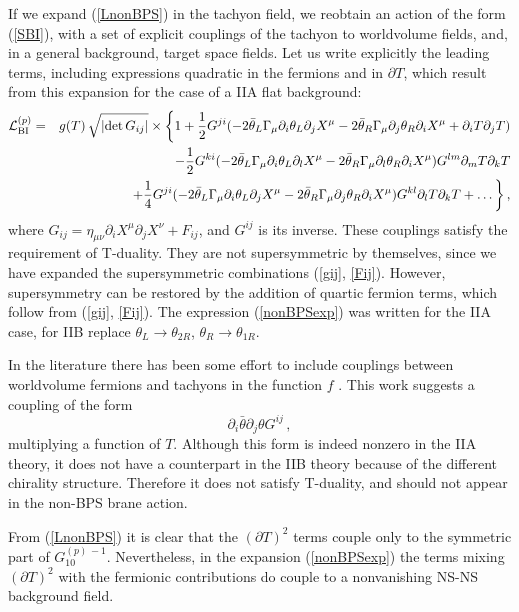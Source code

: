 \documentclass[12pt,a4paper]{article}
\begin{document}
If we expand (\ref{LnonBPS}) in the tachyon field, we reobtain an
 action of the form  (\ref{SBI}), with a set of explicit couplings
 of the tachyon to worldvolume fields, and, in a general background,
 target space fields.
 Let us write explicitly the leading terms, including
 expressions quadratic in the fermions and in $\partial T$,
 which result from this expansion for the case of a IIA flat background:
\begin{eqnarray}
\label{nonBPSexp}
   {\cal L}^{(p)}_{\rm BI} &=& g(T)\,\sqrt{ |{\rm det}\,
       G_{ij} |}\times
  \bigg\{1+
   {1\over 2}G^{ji}(-2\bar\theta_L\Gamma_\mu\partial_i\theta_L\partial_jX^\mu
          -2\bar\theta_R\Gamma_\mu\partial_j\theta_R\partial_iX^\mu
          +\partial_i T\partial_jT) \nonumber\\
  &&-{1\over 2} G^{ki}(-2\bar\theta_L\Gamma_\mu\partial_i\theta_L\partial_lX^\mu
          -2\bar\theta_R\Gamma_\mu\partial_l\theta_R\partial_iX^\mu)
      G^{lm}\partial_mT\partial_kT\nonumber\\
  &&+{1\over 4} G^{ji}(-2\bar\theta_L\Gamma_\mu\partial_i\theta_L\partial_jX^\mu
          -2\bar\theta_R\Gamma_\mu\partial_j\theta_R\partial_iX^\mu)
       G^{kl}\partial_lT\partial_kT
      + \ldots\bigg\}\,,
\end{eqnarray}
where $G_{ij}= \eta_{\mu\nu}\partial_iX^\mu\partial_jX^\nu +F_{ij}$,
 and $G^{ij}$ is its inverse. These couplings satisfy the requirement of
 T-duality. They are not supersymmetric by themselves, since
 we have expanded the supersymmetric combinations (\ref{gij}, \ref{Fij}).
 However, supersymmetry can be restored by
 the addition of quartic fermion terms, which follow
 from (\ref{gij}, \ref{Fij}). The expression (\ref{nonBPSexp})
 was written for the IIA case, for IIB replace $\theta_L\to \theta_{2R}$,
 $\theta_R\to \theta_{1R}$.

In the literature there has been some effort to include couplings between
 worldvolume fermions and tachyons in the function $f$ \cite{Klus}. This work
 suggests a coupling of the form
\begin{equation}
   \partial_i\bar\theta\partial_j\theta G^{ij}\,,
\end{equation}
multiplying a function of $T$. Although this form is indeed nonzero in the
 IIA theory, it does not have a counterpart in the IIB theory because
 of the different chirality structure.
 Therefore it does not satisfy T-duality, and should not
 appear in the non-BPS brane action.

 From (\ref{LnonBPS}) it is clear that the $(\partial T)^2$ terms couple only
 to the symmetric part of $G^{(p)\,-1}_{10}$. Nevertheless, in the expansion
 (\ref{nonBPSexp})  the terms mixing $(\partial T)^2$ with the
 fermionic contributions do couple to a nonvanishing NS-NS background field.
\end{document}

